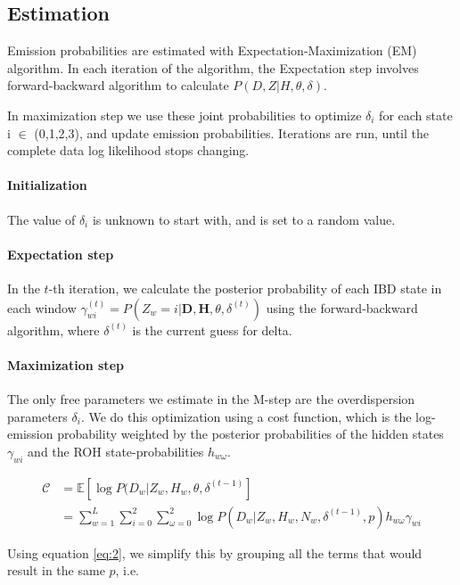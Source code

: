 \documentclass[12pt, letterpaper]{article}
\newcommand{\BD}{\mathbf{D}}
\newcommand{\BH}{\mathbf{H}}
\begin{document}
\subsection{Estimation}


Emission probabilities are estimated with Expectation-Maximization (EM) algorithm. In each iteration of the algorithm, the Expectation step involves forward-backward algorithm to calculate $P(D, Z| H, \theta, \delta)$. 



In maximization step we use these joint probabilities to optimize $\delta_i$ for each state i $\in$ (0,1,2,3), and update emission probabilities. Iterations are run, until the complete data log likelihood stops changing. 

\paragraph{Initialization}
The value of $\delta_i$ is unknown to start with, and is set to a random value.

\paragraph{Expectation step}
In the $t$-th iteration, we calculate the posterior probability of each IBD state in each window $\gamma^{(t)}_{wi} = P(Z_w=i | \BD, \BH, \theta, \delta^{(t)})$ using the forward-backward algorithm, where $\delta^{(t)}$ is the current guess for delta.

\paragraph{Maximization step}
The only free parameters we estimate in the M-step are the overdispersion parameters $\delta_i$. We do this optimization using a cost function, which is the log-emission probability weighted by the posterior probabilities of the hidden states $\gamma_{wi}$ and the ROH state-probabilities $h_{w\omega}$.


\begin{align}\label{eq:4}
\mathcal{C} &= \mathbb{E}[\log P(D_w|Z_w, H_w, \theta, \delta^{(t-1)}]\nonumber\\
&= \sum_{w=1}^L \sum_{i=0}^2\sum^2_{\omega=0} \log P(D_{w}|Z_w, H_w, N_w, \delta^{(t-1)}, p)h_{w\omega}\gamma_{wi}
\end{align}


Using equation \ref{eq:2}, we simplify this by grouping all the terms that would result in the same $p$, i.e.
\end{document}
